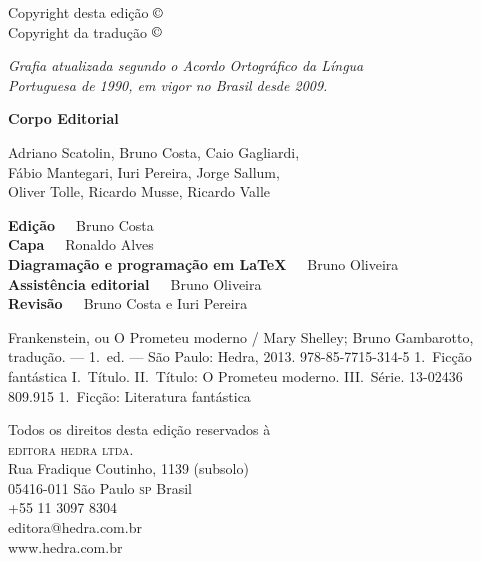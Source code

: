 
\begingroup
\parindent0mm\parskip0mm
\footnotesize
\thispagestyle{empty}

Copyright desta edição $\copyright$ \direitos\ \ano\\
Copyright da tradução $\copyright$ \tradutor\medskip

{\itshape
Grafia atualizada segundo o Acordo Ortográfico da Língua\\
Portuguesa de 1990, em vigor no Brasil desde 2009.
}\medskip

\textbf{Corpo Editorial}\smallskip

Adriano Scatolin,
Bruno Costa,
Caio Gagliardi,\\
Fábio Mantegari,
Iuri Pereira,
Jorge Sallum,\\
Oliver Tolle,
Ricardo Musse,
Ricardo Valle\medskip

\textbf{Edição}\ \ \  Bruno Costa\\
\textbf{Capa}\ \ \  Ronaldo Alves\\
\textbf{Diagramação e programação em \LaTeX}\ \ \  Bruno Oliveira\\
\textbf{Assistência editorial}\ \ \  Bruno Oliveira\\
\textbf{Revisão}\ \ \ Bruno Costa e Iuri Pereira

%
{Frankenstein, ou O Prometeu moderno / Mary Shelley; Bruno Gambarotto,
tradução. --- 1.~ed. --- São Paulo: Hedra, 2013.}%
{978-85-7715-314-5}%
{1.~Ficção fantástica I.~Título. II.~Título: O Prometeu moderno. III.~Série.}%
{13-02436}%
{809.915}%
{1.~Ficção: Literatura fantástica}

Todos os direitos desta edição reservados à\\
\textsc{editora hedra ltda.}\\
Rua Fradique Coutinho, 1139 (subsolo)\\
05416-011 São Paulo \textsc{sp} Brasil\\
+55 11 3097 8304\\
editora@hedra.com.br\\
www.hedra.com.br
\endgroup
\clearpage
